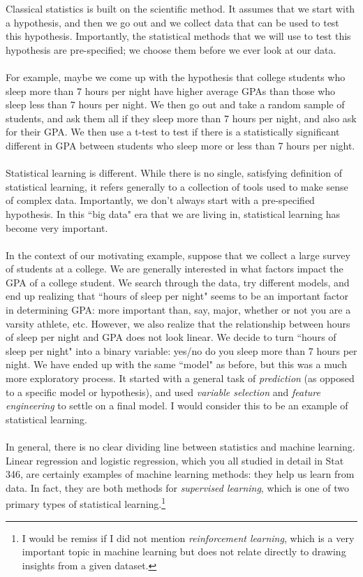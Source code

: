 \documentclass[titlepage,10pt]{scrartcl}
\begin{document}
Classical statistics is built on the scientific method. It assumes that we start with a hypothesis, and then we go out and we collect data that can be used to test this hypothesis. Importantly, the statistical methods that we will use to test this hypothesis are pre-specified; we choose them before we ever look at our data. \\
\\
For example, maybe we come up with the hypothesis that college students who sleep more than 7 hours per night have higher average GPAs than those who sleep less than 7 hours per night. We then go out and take a random sample of students, and ask them all if they sleep more than 7 hours per night, and also ask for their GPA. We then use a t-test to test if there is a statistically significant different in GPA between students who sleep more or less than 7 hours per night. \\
\\
Statistical learning is different. While there is no single, satisfying definition of statistical learning, it refers generally to a collection of tools used to make sense of complex data. Importantly, we don't always start with a pre-specified hypothesis. In this ``big data" era that we are living in, statistical learning has become very important. \\
\\
In the context of our motivating example, suppose that we collect a large survey of students at a college. We are generally interested in what factors impact the GPA of a college student. We search through the data, try different models, and end up realizing that ``hours of sleep per night" seems to be an important factor in determining GPA: more important than, say, major, whether or not you are a varsity athlete, etc. However, we also realize that the relationship between hours of sleep per night and GPA does not look linear. We decide to turn ``hours of sleep per night" into a binary variable: yes/no do you sleep more than 7 hours per night. We have ended up with the same ``model" as before, but this was a much more exploratory process. It started with a general task of \emph{prediction} (as opposed to a specific model or hypothesis), and used \emph{variable selection} and \emph{feature engineering} to settle on a final model. I would consider this to be an example of statistical learning. \\
\\
In general, there is no clear dividing line between statistics and machine learning. Linear regression and logistic regression, which you all studied in detail in Stat 346, are certainly examples of machine learning methods: they help us learn from data. In fact, they are both methods for \emph{supervised learning}, which is one of two primary types of statistical learning.\footnote{I would be remiss if I did not mention \emph{reinforcement learning}, which is a very important topic in machine learning but does not relate directly to drawing insights from a given dataset.}  
\end{document}
